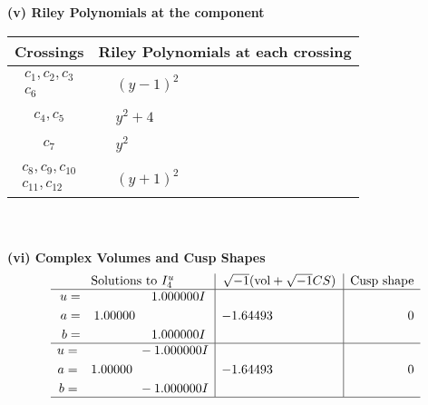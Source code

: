 \documentclass[1p]{elsarticle_modified}
\theoremstyle{definition}
\newcommand{\I}{\sqrt{-1}}
\begin{document}
\newpage\renewcommand{\arraystretch}{1}
\flushleft \textbf{(v) Riley Polynomials at the component}\newline \\
\begin{tabular}{m{50pt}|m{274pt}}
Crossings & \hspace{64pt}Riley Polynomials at each crossing \\
\hline $$\begin{aligned}c_{1},c_{2},c_{3}\\c_{6}\end{aligned}$$&$\begin{aligned}
&(y-1)^2
\end{aligned}$\\
\hline $$\begin{aligned}c_{4},c_{5}\end{aligned}$$&$\begin{aligned}
&y^2+4
\end{aligned}$\\
\hline $$\begin{aligned}c_{7}\end{aligned}$$&$\begin{aligned}
&y^2
\end{aligned}$\\
\hline $$\begin{aligned}c_{8},c_{9},c_{10}\\c_{11},c_{12}\end{aligned}$$&$\begin{aligned}
&(y+1)^2
\end{aligned}$\\
\hline
\end{tabular}\\~\\
\newpage\flushleft \textbf{(vi) Complex Volumes and Cusp Shapes}
$$\begin{array}{c|c|c}  
\text{Solutions to }I^u_{4}& \I (\text{vol} + \sqrt{-1}CS) & \text{Cusp shape}\\
 \hline 
\begin{aligned}
u &= \phantom{-0.000000 -}1.000000 I \\
a &= \phantom{-}1.00000\phantom{ +0.000000I} \\
b &= \phantom{-0.000000 -}1.000000 I\end{aligned}
 & -1.64493\phantom{ +0.000000I} & \phantom{-0.000000 } 0 \\ \hline\begin{aligned}
u &= \phantom{-0.000000 } -1.000000 I \\
a &= \phantom{-}1.00000\phantom{ +0.000000I} \\
b &= \phantom{-0.000000 } -1.000000 I\end{aligned}
 & -1.64493\phantom{ +0.000000I} & \phantom{-0.000000 } 0\\
 \hline 
 \end{array}$$\newpage\newpage\renewcommand{\arraystretch}{1}
\end{document}
